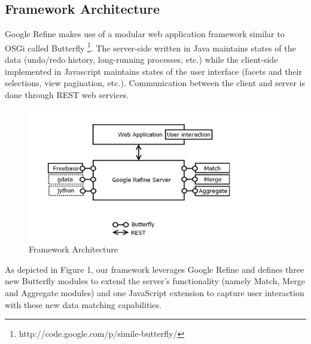 \documentclass{sig-alternate}
\begin{document}

\subsection{Framework Architecture}
Google Refine makes use of a modular web application framework similar to OSGi called Butterfly \footnote{http://code.google.com/p/simile-butterfly/}. The server-side written in Java maintains states of the data (undo/redo history, long-running processes, etc.) while the client-side implemented in Javascript maintains states of the user interface (facets and their selections, view pagination, etc.). Communication between the client and server is done through REST web services.
\begin{figure}[ht!]
  \centering
    \includegraphics[scale=0.6]{architecture-1.png}
  \caption{Framework Architecture}
\end{figure}
As depicted in Figure 1, our framework leverages Google Refine and defines three new Butterfly modules to extend the server's functionality (namely Match, Merge and Aggregate modules) and one JavaScript extension to capture user interaction with these new data matching capabilities.
\end{document}

